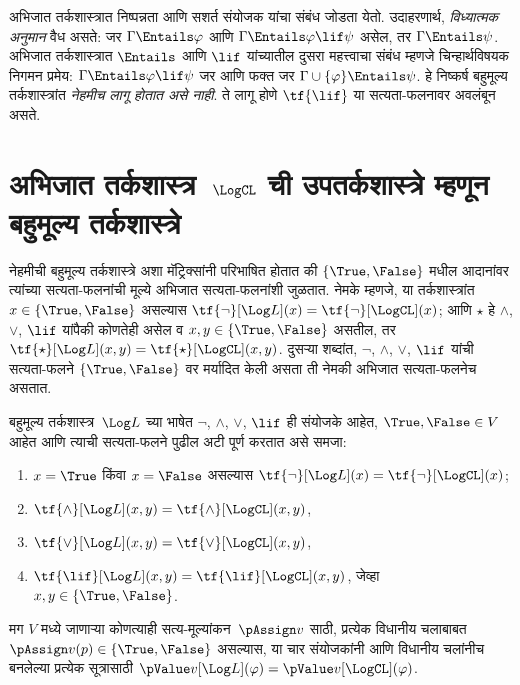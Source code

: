अभिजात तर्कशास्त्रात निष्पन्नता आणि सशर्त संयोजक यांचा संबंध
जोडता येतो. उदाहरणार्थ, \emph{विध्यात्मक अनुमान} वैध असते:
जर $\Gamma \Entails \varphi$ आणि $\Gamma \Entails \varphi \lif \psi$
असेल, तर $\Gamma \Entails \psi$. अभिजात तर्कशास्त्रात
$\Entails$ आणि $\lif$ यांच्यातील दुसरा महत्त्वाचा संबंध म्हणजे
चिन्हार्थविषयक निगमन प्रमेय: $\Gamma \Entails \varphi \lif \psi$
जर आणि फक्त जर $\Gamma \cup \{\varphi\} \Entails \psi$.
हे निष्कर्ष बहुमूल्य तर्कशास्त्रांत \emph{नेहमीच लागू होतात असे नाही}.
ते लागू होणे $\tf{\lif}$ या सत्यता-फलनावर अवलंबून असते.












\section[अभिजात तर्कशास्त्राची उपतर्कशास्त्रे]{अभिजात तर्कशास्त्र~$\LogCL$ ची उपतर्कशास्त्रे म्हणून बहुमूल्य तर्कशास्त्रे}\label{mvl:syn:sub:sec}

नेहमीची बहुमूल्य तर्कशास्त्रे अशा मॅट्रिक्सांनी परिभाषित होतात की
$\{\True, \False\}$ मधील आदानांवर त्यांच्या सत्यता-फलनांची मूल्ये
अभिजात सत्यता-फलनांशी जुळतात. नेमके म्हणजे, या तर्कशास्त्रांत
$x \in \{\True, \False\}$ असल्यास $\tf{\lnot}[\Log L](x) =
\tf{\lnot}[\LogCL](x)$; आणि $\star$ हे $\land$, $\lor$,
$\lif$ यांपैकी कोणतेही असेल व $x, y \in \{\True, \False\}$
असतील, तर $\tf{\star}[\Log L](x,y) =
\tf{\star}[\LogCL](x,y)$. दुसऱ्या शब्दांत,
$\lnot$, $\land$, $\lor$, $\lif$ यांची सत्यता-फलने
$\{\True,\False\}$ वर मर्यादित केली असता ती नेमकी
अभिजात सत्यता-फलनेच असतात.

\begin{prop}\label{mvl:syn:sub:prop:mvl-cl}
  बहुमूल्य तर्कशास्त्र~$\Log L$ च्या भाषेत
  $\lnot$, $\land$, $\lor$, $\lif$ ही संयोजके आहेत,
  $\True, \False \in V$ आहेत आणि त्याची सत्यता-फलने
  पुढील अटी पूर्ण करतात असे समजा:
  \begin{enumerate}
    \item\label{mvl:syn:sub:prop:not} $x = \True$ किंवा $x = \False$
    असल्यास $\tf{\lnot}[\Log L](x) = \tf{\lnot}[\LogCL](x)$;
    \item\label{mvl:syn:sub:prop:land} $\tf{\land}[\Log L](x,y) = \tf{\land}[\LogCL](x,y)$,
    \item\label{mvl:syn:sub:prop:lor} $\tf{\lor}[\Log L](x,y) = \tf{\lor}[\LogCL](x,y)$,
    \item\label{mvl:syn:sub:prop:lif} $\tf{\lif}[\Log L](x,y) = \tf{\lif}[\LogCL](x,y)$,
    जेव्हा $x, y \in \{\True, \False\}$.
  \end{enumerate}
  मग $V$ मध्ये जाणाऱ्या कोणत्याही सत्य-मूल्यांकन~$\pAssign v$
  साठी, प्रत्येक विधानीय चलाबाबत $\pAssign
  v(p) \in \{\True,\False\}$ असल्यास,
  या चार संयोजकांनी आणि विधानीय चलांनीच बनलेल्या प्रत्येक
  सूत्रासाठी $\pValue v[\Log L](\varphi) = \pValue
  v[\LogCL](\varphi)$.
\end{prop}

